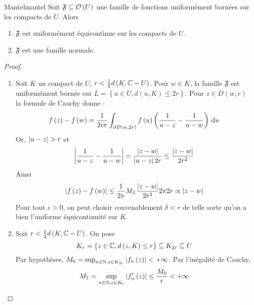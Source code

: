 \documentclass{cours}
\begin{document}
\begin{théorème}{Mantel}{mantel}
	Soit $\mathfrak{F} \subseteq \mathcal{O}\left(U\right)$ une famille de fonctions uniformément bornées sur les compacts de $U$. Alors
	\begin{enumerate}
		\item $\mathfrak{F}$ est uniformément équicontinue sur les compacts de $U$. 
		\item $\mathfrak{F}$ est une famille normale. 
	\end{enumerate}
\end{théorème}
\begin{proof}
	\begin{enumerate}
		\item Soit $K$ un compact de $U$, $r < \frac{1}{3}d\left(K, \mathbb{C} - U\right)$. 
        Pour $w \in K$, la famille $\mathfrak{F}$ est uniformément bornée sur $L = \left\{u \in U, d\left(u, K\right) \leq 2r\right\}$.
        Pour $z \in D\left(w, r\right)$ la formule de Cauchy donne : 
        \begin{equation*}
            f\left(z\right) - f\left(w\right) = \frac{1}{2i\pi}\int_{\partial D\left(w, 2r\right)}f\left(u\right)\left(\frac{1}{u - z} - \frac{1}{u - w}\right){\rm \, d} u
        \end{equation*}
        Or, $\left|u - z\right| > r$ et 
        \begin{equation*}
            \left|\frac{1}{u - z} - \frac{1}{u - w}\right| = \frac{\left|z - w\right|}{\left|u - z\right|2r} \leq \frac{\left|z - w\right|}{2r^{2}}
        \end{equation*}
        Ainsi
        \begin{equation*}
            \left|f\left(z\right) - f\left(w\right)\right| \leq \frac{1}{2\pi} M_{L}\frac{\left|z - w\right|}{2r^{2}}2\pi 2r \propto\left|z - w\right|
        \end{equation*}
        Pour tout $\epsilon > 0$, on peut choisir convenablement $\delta < r$ de telle sorte qu'on a bien l'uniforme équicontinuité sur $K$.
        \item Soit $r < \frac{1}{2}d\left(K, \mathbb{C} - U\right)$. On pose
        \begin{equation*}
            K_{r} = \left\{z \in \mathbb{C}, d\left(z, K\right) \leq r\right\} \subseteq K_{2r} \subseteq U
        \end{equation*}
        Par hypothèses, $M_{0} = \sup_{n \in \mathbb{N}, z \in K_{2r}}\left|f_{n}\left(z\right)\right| < + \infty$. Par l'inégalité de Cauchy, 
        \begin{equation*}
            M_{1} = \sup_{n \in \N, z \in K_{r}} \abs{f_{n}'\left(z\right)} \leq \frac{M_{0}}{r} < + \infty

\end{equation*}
\end{enumerate}
\end{proof}
\end{document}
